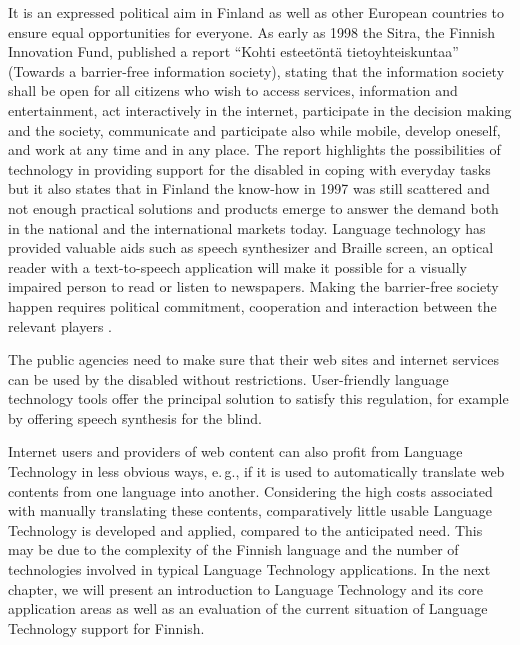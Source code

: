 \begin{multicols}{2}
It is an expressed political aim in Finland as well as other European countries to ensure equal opportunities for everyone. As early as 1998 the Sitra, the Finnish Innovation Fund, published a report ``\foreignlanguage{finnish}{Kohti esteetöntä tietoyhteiskuntaa}'' (Towards a barrier-free information society), stating that the information society shall be open for all citizens who wish to access services, information and entertainment, act interactively in the internet, participate in the decision making and the society, communicate and participate also while mobile, develop oneself, and work at any time and in any place. The report highlights the possibilities of technology in providing support for the disabled in coping with everyday tasks but it also states that in Finland the know-how in 1997 was still scattered and not enough practical solutions and products emerge to answer the demand both in the national and the international markets today. Language technology has provided valuable aids such as speech synthesizer and Braille screen, an optical reader with a text-to-speech application will make it possible for a visually impaired person to read or listen to newspapers. Making the barrier-free society happen requires political commitment, cooperation and interaction between the relevant players \cite{Sitra1998}.

The public agencies need to make sure that their web sites and internet services can be used by the disabled without restrictions. User-friendly language technology tools offer the principal solution to satisfy this regulation, for example by offering speech synthesis for the blind.

Internet users and providers of web content can also profit from Language Technology in less obvious ways, e.\,g., if it is used to automatically translate web contents from one language into another. Considering the high costs associated with manually translating these contents, comparatively little usable Language Technology is developed and applied, compared to the anticipated need. This may be due to the complexity of the Finnish language and the number of technologies involved in typical Language Technology applications. In the next chapter, we will present an introduction to Language Technology and its core application areas as well as an evaluation of the current situation of Language Technology support for Finnish.

\end{multicols}

\clearpage
{}

